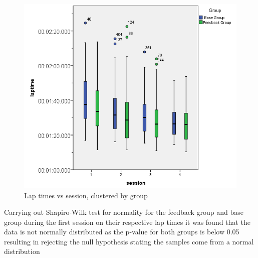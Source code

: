 \begin{figure}[!htb]
	\centering
	\includegraphics[width=\textwidth]{charts/laptimes.png}
	\caption{Lap times vs session, clustered by group}
	\label{fig:chart-laptimes}
\end{figure}

Carrying out Shapiro-Wilk test for normality for the feedback group and base group during the first session on their respective lap times it was found that the data is not normally distributed as the p-value for both groups is below 0.05 resulting in rejecting the null hypothesis stating the samples come from a normal distribution

